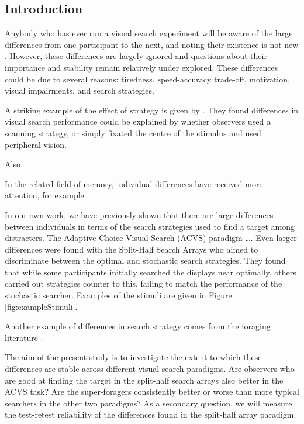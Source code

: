 \documentclass[]{rsos}%
\begin{document}
\begin{fmtext}
\section{Introduction}
Anybody who has ever run a visual search experiment will be aware of the large differences from one participant to the next, and noting their existence is not new \cite{mackworth1948}. However, these differences are largely ignored and questions about their importance and stability remain relatively under explored. These differences could be due to several reasons: tiredness\cite{mackworth1948}, speed-accuracy trade-off, motivation, visual impairments, and search strategies\cite{boot2006}. 

A striking example of the effect of strategy is given by \cite{boot2006, boot2009}. They found differences in visual search performance could be explained by whether observers used a scanning strategy, or simply fixated the centre of the stimulus and used peripheral vision. 

Also \cite{proulx2011}

In the related field of memory, individual differences have received more attention, for example \cite{sobel2007}.


In our own work, we have previously shown that there are large differences between individuals in terms of the search strategies used to find a target among distracters. The Adaptive Choice Visual Search (ACVS) paradigm  \cite{irons-leber2016} \ldots. Even larger differences were found with the Split-Half Search Arrays \cite{nowakowsak2017} who aimed to discriminate between the optimal  \cite{najemnik-geisler2008} and stochastic \cite{clarke2016} search strategies. They found that while some participants initially searched the displays near optimally, others carried out strategies counter to this, failing to match the performance of the stochastic searcher. Examples of the stimuli are given in Figure \ref{fig:exampleStimuli}. 

Another example of differences in search strategy comes from the foraging literature \cite{kristjansson2014,johannesson2016}.
\end{fmtext}

\maketitle

The aim of the present study is to investigate the extent to which these differences are stable across different visual search paradigms. Are observers who are good at finding the target in the split-half search arrays also better in the ACVS task? Are the super-foragers consistently better or worse than more typical searchers in the other two paradigms? As a secondary question, we will measure the test-retest reliability of the differences found in the split-half array paradigm. 
\end{document}

